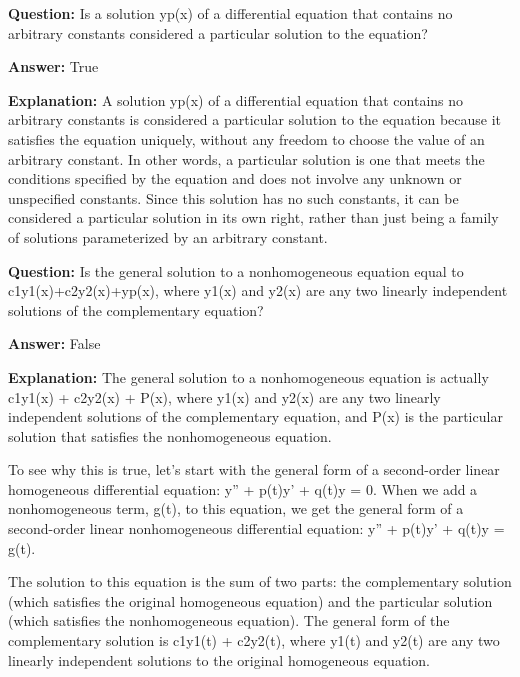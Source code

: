 \documentclass{article}
\begin{document}
                \vspace{0.5cm} 
        
            
                \textbf {Question:} Is a solution yp(x) of a differential equation that contains no arbitrary constants considered a particular solution to the equation?
                
                \textbf{Answer:} True

                \textbf{Explanation:} A solution yp(x) of a differential equation that contains no arbitrary constants is considered a particular solution to the equation because it satisfies the equation uniquely, without any freedom to choose the value of an arbitrary constant. In other words, a particular solution is one that meets the conditions specified by the equation and does not involve any unknown or unspecified constants. Since this solution has no such constants, it can be considered a particular solution in its own right, rather than just being a family of solutions parameterized by an arbitrary constant.
                
                \vspace{0.5cm} 
        
            
                \textbf {Question:} Is the general solution to a nonhomogeneous equation equal to c1y1(x)+c2y2(x)+yp(x), where y1(x) and y2(x) are any two linearly independent solutions of the complementary equation?
                
                \textbf{Answer:} False

                \textbf{Explanation:} The general solution to a nonhomogeneous equation is actually c1y1(x) + c2y2(x) + P(x), where y1(x) and y2(x) are any two linearly independent solutions of the complementary equation, and P(x) is the particular solution that satisfies the nonhomogeneous equation.

To see why this is true, let's start with the general form of a second-order linear homogeneous differential equation: y'' + p(t)y' + q(t)y = 0. When we add a nonhomogeneous term, g(t), to this equation, we get the general form of a second-order linear nonhomogeneous differential equation: y'' + p(t)y' + q(t)y = g(t).

The solution to this equation is the sum of two parts: the complementary solution (which satisfies the original homogeneous equation) and the particular solution (which satisfies the nonhomogeneous equation). The general form of the complementary solution is c1y1(t) + c2y2(t), where y1(t) and y2(t) are any two linearly independent solutions to the original homogeneous equation.
\end{document}

